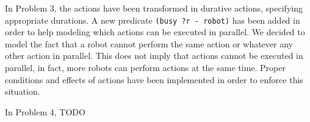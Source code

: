In Problem 3, the actions have been transformed in durative actions, specifying appropriate durations. %
A new predicate \texttt{(busy ?r - robot)} has been added in order to help modeling which actions can be
executed in parallel. 
We decided to model the fact that a robot cannot perform the same action or whatever any other action in 
parallel. This does not imply that actions cannot be executed in parallel, in fact, more robots can perform
actions at the same time. 
Proper conditions and effects of actions have been implemented in order to enforce this situation.

In Problem 4, TODO
